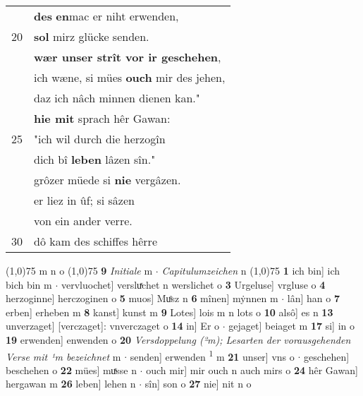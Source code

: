 \documentclass[8pt,a4paper,notitlepage]{article}
\begin{document}
\begin{table}[ht]
\begin{minipage}[t]{0.5\linewidth}
\begin{tabular}{rl}
 & \textbf{des} \textbf{en}mac er niht erwenden,\\ 
20 & \textbf{sol} mirz glücke senden.\\ 
 & \textbf{wær unser strît vor ir geschehen},\\ 
 & ich wæne, si mües \textbf{ouch} mir des jehen,\\ 
 & daz ich nâch minnen dienen kan."\\ 
 & \textbf{hie mit} sprach hêr Gawan:\\ 
25 & "ich wil durch die herzogîn\\ 
 & dich bî \textbf{leben} lâzen sîn."\\ 
 & grôzer müede si \textbf{nie} vergâzen.\\ 
 & er liez in ûf; si sâzen\\ 
 & von ein ander verre.\\ 
30 & dô kam des schiffes hêrre\\ 
\end{tabular}
\scriptsize
\line(1,0){75} \newline
m n o \newline
\line(1,0){75} \newline
\textbf{9} \textit{Initiale} m   $\cdot$ \textit{Capitulumzeichen} n  \newline
\line(1,0){75} \newline
\textbf{1} ich bin] ich bich bin m  $\cdot$ vervluochet] versluͯchet n werslichet o \textbf{3} Urgeluse] vrgluse o \textbf{4} herzoginne] herczoginen o \textbf{5} muos] Muͦsz n \textbf{6} mînen] mẏnnen m  $\cdot$ lân] han o \textbf{7} erben] erheben m \textbf{8} kanst] kunst m \textbf{9} Lotes] lois m n lots o \textbf{10} alsô] es n \textbf{13} unverzaget] [verczaget]: vnverczaget o \textbf{14} in] Er o  $\cdot$ gejaget] beiaget m \textbf{17} si] in o \textbf{19} erwenden] enwenden o \textbf{20} \textit{Versdoppelung (²m); Lesarten der vorausgehenden Verse mit ¹m bezeichnet} m   $\cdot$ senden] erwenden \textsuperscript{1}\hspace{-1.3mm} m \textbf{21} unser] vns o  $\cdot$ geschehen] beschehen o \textbf{22} mües] muͯsse n  $\cdot$ ouch mir] mir ouch n auch mirs o \textbf{24} hêr Gawan] hergawan m \textbf{26} leben] lehen n  $\cdot$ sîn] son o \textbf{27} nie] nit n o \newline
\end{minipage}
\end{table}
\newpage
\end{document}
